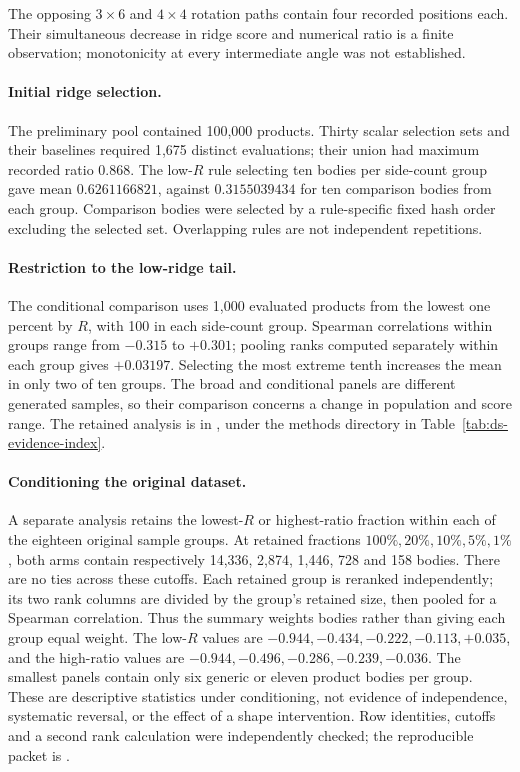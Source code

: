 The opposing $3\times6$ and $4\times4$ rotation paths contain four recorded
positions each. Their simultaneous decrease in ridge score and numerical
ratio is a finite observation; monotonicity at every intermediate angle
was not established.

\paragraph{Initial ridge selection.}
The preliminary pool contained 100,000 products. Thirty scalar selection
sets and their baselines required 1,675 distinct evaluations; their union
had maximum recorded ratio $0.868$. The low-$R$ rule selecting ten bodies
per side-count group gave mean $0.6261166821$, against $0.3155039434$ for
ten comparison bodies from each group. Comparison bodies were selected by
a rule-specific fixed hash order excluding the selected set. Overlapping
rules are not independent repetitions.

\paragraph{Restriction to the low-ridge tail.}
The conditional comparison uses 1,000 evaluated products from the lowest
one percent by $R$, with 100 in each side-count group. Spearman
correlations within groups range from $-0.315$ to $+0.301$; pooling ranks
computed separately within each group gives $+0.03197$. Selecting the
most extreme tenth increases the mean in only two of ten groups. The
broad and conditional panels are different generated samples, so their
comparison concerns a change in population and score range. The retained
analysis is in ,
under the methods directory in Table~\ref{tab:ds-evidence-index}.

\paragraph{Conditioning the original dataset.}
A separate analysis retains the lowest-$R$ or highest-ratio fraction within
each of the eighteen original sample groups. At retained fractions
$100\%,20\%,10\%,5\%,1\%$, both arms contain respectively
14,336, 2,874, 1,446, 728 and 158 bodies. There are no ties across these
cutoffs. Each retained group is reranked independently; its two rank
columns are divided by the group's retained size, then pooled for a
Spearman correlation. Thus the summary weights bodies rather than giving
each group equal weight. The low-$R$ values are
$-0.944,-0.434,-0.222,-0.113,+0.035$, and the high-ratio values are
$-0.944,-0.496,-0.286,-0.239,-0.036$. The smallest panels contain only
six generic or eleven product bodies per group. These are descriptive
statistics under conditioning, not evidence of independence, systematic
reversal, or the effect of a shape intervention. Row identities, cutoffs
and a second rank calculation were independently checked; the reproducible
packet is .

